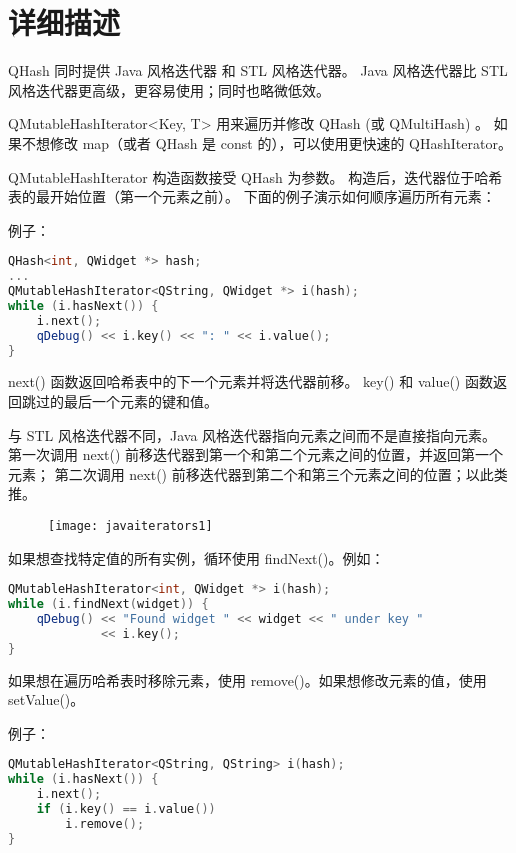 \section{详细描述}

QHash 同时提供 Java 风格迭代器 和 STL 风格迭代器。
Java 风格迭代器比 STL 风格迭代器更高级，更容易使用；同时也略微低效。

QMutableHashIterator<Key, T> 用来遍历并修改 QHash (或 QMultiHash) 。
如果不想修改 map（或者 QHash 是 const 的），可以使用更快速的 QHashIterator。

QMutableHashIterator 构造函数接受 QHash 为参数。
构造后，迭代器位于哈希表的最开始位置（第一个元素之前）。
下面的例子演示如何顺序遍历所有元素：

例子：

\begin{lstlisting}[language=C++]
QHash<int, QWidget *> hash;
...
QMutableHashIterator<QString, QWidget *> i(hash);
while (i.hasNext()) {
    i.next();
    qDebug() << i.key() << ": " << i.value();
}
\end{lstlisting}

next() 函数返回哈希表中的下一个元素并将迭代器前移。
key() 和 value() 函数返回跳过的最后一个元素的键和值。

与 STL 风格迭代器不同，Java 风格迭代器指向元素之间而不是直接指向元素。
第一次调用 next() 前移迭代器到第一个和第二个元素之间的位置，并返回第一个元素；
第二次调用 next() 前移迭代器到第二个和第三个元素之间的位置；以此类推。


\begin{figure}[hbt!]  
	\centering
    \texttt{[image: javaiterators1]}
\end{figure}


如果想查找特定值的所有实例，循环使用 findNext()。例如：

\begin{lstlisting}[language=C++]
QMutableHashIterator<int, QWidget *> i(hash);
while (i.findNext(widget)) {
    qDebug() << "Found widget " << widget << " under key "
             << i.key();
}
\end{lstlisting}

如果想在遍历哈希表时移除元素，使用 remove()。如果想修改元素的值，使用 setValue()。

例子：

\begin{lstlisting}[language=C++]
QMutableHashIterator<QString, QString> i(hash);
while (i.hasNext()) {
    i.next();
    if (i.key() == i.value())
        i.remove();
}
\end{lstlisting}

